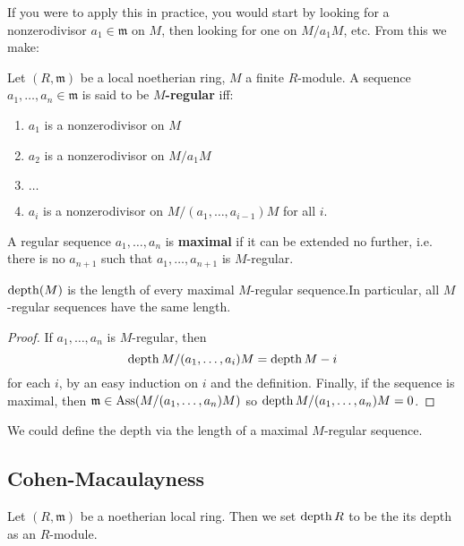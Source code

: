 If you were to apply this in practice, you would start by
looking for a
nonzerodivisor $a_1 \in \mathfrak{m}$ on $M$, then looking for
one on $M/a_1
M$, etc.
From this we make:

\begin{definition}
Let $(R, \mathfrak{m})$ be a local noetherian ring, $M$ a finite
$R$-module. A
sequence $a_1, \dots, a_n \in \mathfrak{m}$ is said to be
\textbf{$M$-regular} iff:
\begin{enumerate}
\item $a_1$ is a nonzerodivisor on $M$
\item $a_2$ is a nonzerodivisor on $M/a_1 M$
\item  $\dots$
\item $a_i$ is a nonzerodivisor on $M/(a_1, \dots, a_{i-1})M$
for all $i$.
\end{enumerate}
A regular sequence $a_1, \dots, a_n$ is \textbf{maximal } if it
can be extended
no further, i.e. there is no $a_{n+1}$ such that $a_1, \dots,
a_{n+1}$ is
$M$-regular.
\end{definition}

\begin{corollary}
$\operatorname{depth}(M)$ is the length of every maximal $M$-regular
sequence.In particular,
all $M$-regular sequences have the same length.
\end{corollary}

\begin{proof}
If $a_1, \dots, a_n$ is $M$-regular, then
\[ \operatorname{depth} M/(a_1, \dots, a_i)M = \operatorname{depth} M -i  \]
for each $i$, by an easy induction on $i$ and the definition.
Finally, if the sequence is maximal,
then $\mathfrak{m} \in \operatorname{Ass}(M/(a_1, \dots, a_n)M)$ so $\operatorname{depth}
M/(a_1, \dots,
a_n) M = 0$.
\end{proof}

\begin{remark}
We could define the depth via the length of a maximal
$M$-regular sequence.
\end{remark}


\subsection{Cohen-Macaulayness}

\begin{definition}
Let $(R, \mathfrak{m})$ be a noetherian local ring. Then
we set $\operatorname{depth} R$ to be the its depth as an $R$-module.
\end{definition}




